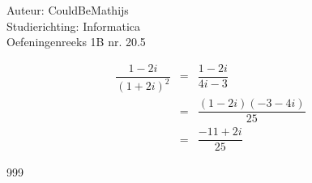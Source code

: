 \documentclass[a4paper]{article}
\begin{document}
  
\noindent \large Auteur: CouldBeMathijs \\
\noindent \large Studierichting: Informatica\\
\noindent \large Oefeningenreeks 1B nr. 20.5\\

\medskip

\normalsize

\begin{eqnarray*}
 \dfrac{1-2i}{(1+2i)^2} & = & \dfrac{1-2i}{4i-3}\\
 &=&\dfrac{(1-2i)(-3-4i)}{25}\\
 &=&\dfrac{-11+2i}{25}
\end{eqnarray*}

\begin{thebibliography}{999}
\end{thebibliography}
\end{document}
